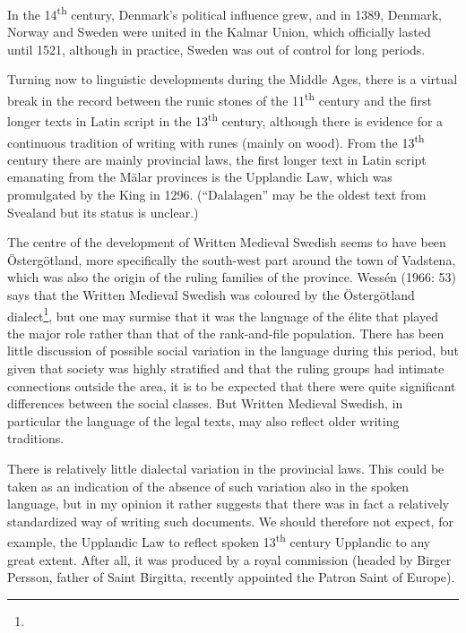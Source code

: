 \begin{styleBodytextC}
In the 14\textsuperscript{th} century, Denmark’s political influence grew, and in 1389, Denmark, Norway and Sweden were united in the Kalmar Union, which officially lasted until 1521, although in practice, Sweden was out of control for long periods. 

\end{styleBodytextC}

\begin{styleBodytextC}
Turning now to linguistic developments during the Middle Ages, there is a virtual break in the record between the runic stones of the 11\textsuperscript{th} century and the first longer texts in Latin script in the 13\textsuperscript{th} century, although there is evidence for a continuous tradition of writing with runes (mainly on wood). From the 13\textsuperscript{th} century there are mainly provincial laws, the first longer text in Latin script emanating from the Mälar provinces is the Upplandic Law, which was promulgated by the King in 1296. (“Dalalagen” may be the oldest text from Svealand but its status is unclear.) 

\end{styleBodytextC}

\begin{styleBodytextC}
The centre of the development of Written Medieval Swedish seems to have been Östergötland, more specifically the south-west part around the town of Vadstena, which was also the origin of the ruling families of the province. Wessén (1966: 53) says that the Written Medieval Swedish was coloured by the Östergötland dialect\footnote{}, but one may surmise that it was the language of the élite that played the major role rather than that of the rank-and-file population. There has been little discussion of possible social variation in the language during this period, but given that society was highly stratified and that the ruling groups had intimate connections outside the area, it is to be expected that there were quite significant differences between the social classes. But Written Medieval Swedish, in particular the language of the legal texts, may also reflect older writing traditions.

\end{styleBodytextC}

\begin{styleBodytextC}
There is relatively little dialectal variation in the provincial laws. This could be taken as an indication of the absence of such variation also in the spoken language, but in my opinion it rather suggests that there was in fact a relatively standardized way of writing such documents. We should therefore not expect, for example, the Upplandic Law to reflect spoken 13\textsuperscript{th} century Upplandic to any great extent. After all, it was produced by a royal commission (headed by Birger Persson, father of Saint Birgitta, recently appointed the Patron Saint of Europe). 

\end{styleBodytextC}

